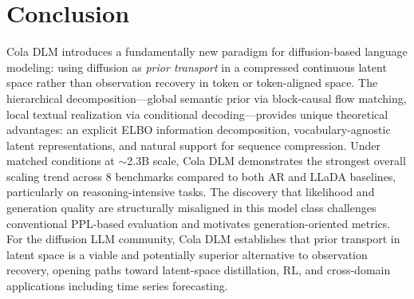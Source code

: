 \documentclass[11pt]{article}
\begin{document}
\section{Conclusion}

Cola DLM introduces a fundamentally new paradigm for diffusion-based language modeling: using diffusion as \emph{prior transport} in a compressed continuous latent space rather than observation recovery in token or token-aligned space. The hierarchical decomposition---global semantic prior via block-causal flow matching, local textual realization via conditional decoding---provides unique theoretical advantages: an explicit ELBO information decomposition, vocabulary-agnostic latent representations, and natural support for sequence compression. Under matched conditions at $\sim$2.3B scale, Cola DLM demonstrates the strongest overall scaling trend across 8 benchmarks compared to both AR and LLaDA baselines, particularly on reasoning-intensive tasks. The discovery that likelihood and generation quality are structurally misaligned in this model class challenges conventional PPL-based evaluation and motivates generation-oriented metrics. For the diffusion LLM community, Cola DLM establishes that prior transport in latent space is a viable and potentially superior alternative to observation recovery, opening paths toward latent-space distillation, RL, and cross-domain applications including time series forecasting.
\end{document}

